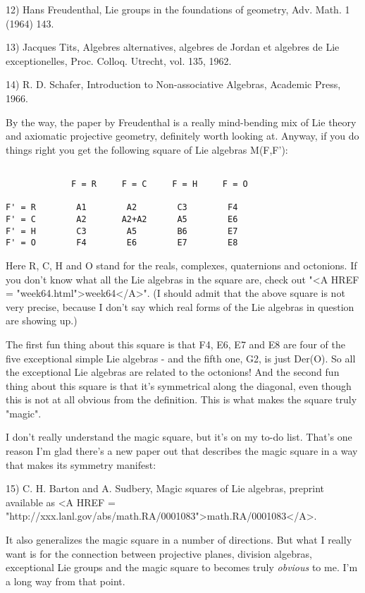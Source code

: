 12) Hans Freudenthal, Lie groups in the foundations of geometry,
Adv. Math. 1 (1964) 143.

13) Jacques Tits, Algebres alternatives, algebres de Jordan et 
algebres de Lie exceptionelles, Proc. Colloq. Utrecht, vol. 135, 1962. 

14) R. D. Schafer, Introduction to Non-associative Algebras, Academic
Press, 1966.

By the way, the paper by Freudenthal is a really mind-bending mix of 
Lie theory and axiomatic projective geometry, definitely worth looking
at.  Anyway, if you do things right you get the following square of Lie 
algebras M(F,F'):


\begin{verbatim}

             F = R     F = C     F = H     F = O

F' = R        A1        A2        C3        F4
F' = C        A2       A2+A2      A5        E6
F' = H        C3        A5        B6        E7
F' = O        F4        E6        E7        E8

\end{verbatim}
    

Here R, C, H and O stand for the reals, complexes, quaternions and
octonions.  If you don't know what all the Lie algebras in the square
are, check out "<A HREF = "week64.html">week64</A>".  (I
should admit that the above square is not very precise, because I don't
say which real forms of the Lie algebras in question are showing up.)

The first fun thing about this square is that F4, E6, E7 and E8 are 
four of the five exceptional simple Lie algebras - and the fifth 
one, G2, is just Der(O).  So all the exceptional Lie algebras are
related to the octonions!  And the second fun thing about this square
is that it's symmetrical along the diagonal, even though this is
not at all obvious from the definition.  This is what makes the square
truly "magic".  

I don't really understand the magic square, but it's on my to-do
list.  That's one reason I'm glad there's a new paper out that 
describes the magic square in a way that makes its symmetry manifest:

15) C. H. Barton and A. Sudbery, Magic squares of Lie algebras, 
preprint available as  <A HREF = "http://xxx.lanl.gov/abs/math.RA/0001083">math.RA/0001083</A>.

It also generalizes the magic square in a number of directions.  But
what I really want is for the connection between projective planes, 
division algebras, exceptional Lie groups and the magic square to 
becomes truly \emph{obvious} to me.  I'm a long way from that point.



